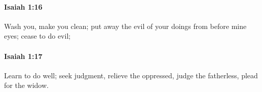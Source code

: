 		\paragraph{Isaiah 1:16} %
			\label{ISAIAH-1-16}

			Wash you, make you clean; put away the evil of your doings from before mine eyes; cease to do evil;


		\paragraph{Isaiah 1:17} %
			\label{ISAIAH-1-17}

			Learn to do well; seek judgment, relieve the oppressed, judge the fatherless, plead for the widow.


